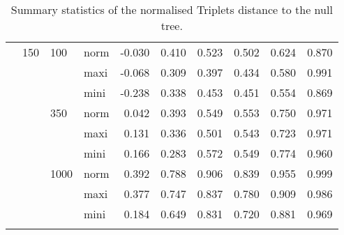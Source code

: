 \begin{longtable}{llllrrrrrr}
   & 150 & 100 & norm & -0.030 & 0.410 & 0.523 & 0.502 & 0.624 & 0.870 \\ 
   &  &  & maxi & -0.068 & 0.309 & 0.397 & 0.434 & 0.580 & 0.991 \\ 
   &  &  & mini & -0.238 & 0.338 & 0.453 & 0.451 & 0.554 & 0.869 \\ 
   &  & 350 & norm & 0.042 & 0.393 & 0.549 & 0.553 & 0.750 & 0.971 \\ 
   &  &  & maxi & 0.131 & 0.336 & 0.501 & 0.543 & 0.723 & 0.971 \\ 
   &  &  & mini & 0.166 & 0.283 & 0.572 & 0.549 & 0.774 & 0.960 \\ 
   &  & 1000 & norm & 0.392 & 0.788 & 0.906 & 0.839 & 0.955 & 0.999 \\ 
   &  &  & maxi & 0.377 & 0.747 & 0.837 & 0.780 & 0.909 & 0.986 \\ 
   &  &  & mini & 0.184 & 0.649 & 0.831 & 0.720 & 0.881 & 0.969 \\ 
   \hline
\hline
\caption{Summary statistics of the normalised Triplets distance to the null tree.} 
\label{Full_Tab_SummaryTrnull}
\end{longtable}
